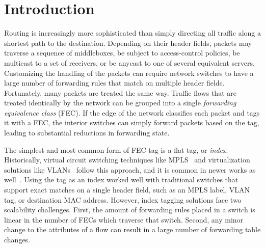 \section{Introduction}
\label{sec:intro}
Routing is increasingly more sophisticated than simply directing all traffic along a shortest path to the destination.  Depending on their header fields, packets may traverse a sequence of middleboxes, be subject to access-control policies, be multicast to a set of receivers, or be anycast to one of several equivalent servers.  Customizing the handling of the packets can require network switches to have a large number of forwarding rules that match on multiple header fields.  Fortunately, many packets are treated the same way.  Traffic flows that are treated identically by the network can be grouped into a single \emph{forwarding equivalence class} (FEC). If the edge of the network classifies each packet and tags it with a FEC, the interior switches can simply forward packets based on the tag, leading to substantial reductions in forwarding state.

The simplest and most common form of FEC tag is a flat tag, or \emph{index}. Historically, virtual circuit switching techniques like MPLS~\cite{mpls} and virtualization solutions like VLANs~\cite{vlan} follow this approach, and it is common in newer works as well~\cite{flowtags,sdx}.  Using the tag as an index worked well with traditional switches that support exact matches on a single header field, such as an MPLS label, VLAN tag, or destination MAC address.  However, index tagging solutions face two scalability challenges. First, the amount of forwarding rules placed in a switch is linear in the number of FECs which traverse that switch. Second, any minor change to the attributes of a flow can result in a large number of forwarding table changes.

